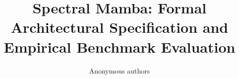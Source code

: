 \title{\textbf{Spectral Mamba: Formal Architectural Specification and Empirical Benchmark Evaluation}}

\author{Anonymous authors}
